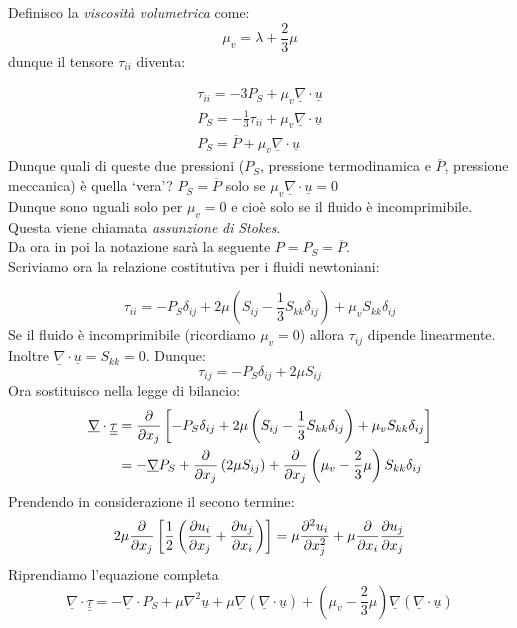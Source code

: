 Definisco la \emph{viscosità volumetrica} come:
\[
\mu_v = \lambda +\frac{2}{3}\mu 
\]
dunque il tensore $ \tau _{ii} $ diventa:

\begin{align*}
  \tau _{ii} = -3P_S+\mu_v \underline{\nabla}\cdot \underline{u}\\
  P_S = - \frac{1}{3}\tau _{ii} + \mu_v \underline{\nabla}\cdot \underline{u}\\
  P_S = \overline{P} + \mu_v \underline{\nabla}\cdot \underline{u} 
\end{align*}
Dunque quali di queste due pressioni ($ P_S $, pressione termodinamica e $ \overline{P} $, pressione meccanica) è quella `vera'?
$ P_S = \overline{P} $ solo se $ \mu_v \underline{\nabla}\cdot \underline{u} = 0 $\\
Dunque sono uguali solo per $ \mu_v =0 $ e cioè solo se il fluido è incomprimibile.
Questa viene chiamata \emph{assunzione} \emph{di} \emph{Stokes}.\\
Da ora in poi la notazione sarà la seguente $ P = P_S = \overline{P} $.\\
Scriviamo ora la relazione costitutiva per i fluidi newtoniani:

\begin{equation}
  \tau _{ii} = -P_S\delta_{ij} +2\mu \left( S_{ij} -\frac{1}{3}S_{kk} \delta_{ij} \right) + \mu _v S_{kk} \delta _{ij}
\end{equation}
Se il fluido è incomprimibile (ricordiamo $ \mu _v = 0 $) allora $ \tau _{ij} $ dipende linearmente. Inoltre $ \underline{\nabla}\cdot \underline{u} =S_{kk} = 0 $. Dunque:
\[
\tau _{ij} = -P_S \delta _{ij} +2\mu S_{ij}
\]
Ora sostituisco nella legge di bilancio:
\begin{align*}
  \underline{\nabla}\cdot \underline{\underline{\tau }} &= \frac{\partial}{\partial x_j}\left[ -P_S\delta_{ij} +2\mu \left( S_{ij} -\frac{1}{3} S_{kk}\delta_{ij} \right) +\mu_v S_{kk}\delta_{ij} \right] \\
                                                        &=-\underline{\nabla}P_S + \frac{\partial}{\partial x_j} \left( 2\mu S_{ij}\right) +\frac{\partial}{\partial x_j}\left( \mu _v-\frac{2}{3}\mu \right) S_{kk}\delta_{ij} 
\end{align*}
Prendendo in considerazione il secono termine:
\[
2\mu \frac{\partial}{\partial x_j}\left[ \frac{1}{2}\left( \frac{\partial u_i}{\partial x_j}+\frac{\partial u_j}{\partial x_i}\right) \right]  = \mu \frac{\partial^2u_i}{\partial x_{j}^2} + \mu \frac{\partial}{\partial x_i}\frac{\partial u_j}{\partial x_j}
\]
Riprendiamo l'equazione completa
\[
\underline{\nabla}\cdot \underline{\underline{\tau }} = -\underline{\nabla}\cdot P_S + \mu \nabla ^2 \underline{u} + \mu \underline{\nabla}\left( \underline{\nabla}\cdot \underline{u}\right)  + \left( \mu _v -\frac{2}{3}\mu \right) \underline{\nabla}\left( \underline{\nabla}\cdot \underline{u}\right) 
\]
